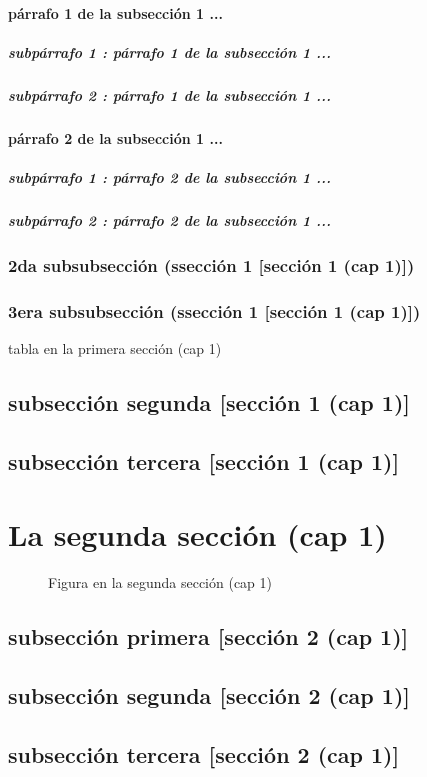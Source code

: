 \documentclass[12pt,a4paper]{report}
\begin{document}
\paragraph{párrafo 1 de la subsección 1 ...}
\subparagraph{subpárrafo 1 : párrafo 1 de la subsección 1 ...}
\subparagraph{subpárrafo 2 : párrafo 1 de la subsección 1 ...}
\paragraph{párrafo 2 de la subsección 1 ...}
\subparagraph{subpárrafo 1 : párrafo 2 de la subsección 1 ...}
\subparagraph{subpárrafo 2 : párrafo 2 de la subsección 1 ...}
\subsubsection{2da subsubsección (ssección 1 [sección 1 (cap 1)])}
\subsubsection{3era subsubsección (ssección 1 [sección 1 (cap 1)])}
\begin{table}[H]
\caption{tabla en la primera sección (cap 1)}
\end{table}
\subsection{subsección segunda [sección 1 (cap 1)]}
\subsection{subsección tercera [sección 1 (cap 1)]}
\section{La segunda sección (cap 1)}
\begin{figure}[H]
\caption{Figura en la segunda sección (cap 1)}
\end{figure}
\subsection{subsección primera [sección 2 (cap 1)]}
\subsection{subsección segunda [sección 2 (cap 1)]}
\subsection{subsección tercera [sección 2 (cap 1)]}
\end{document}
